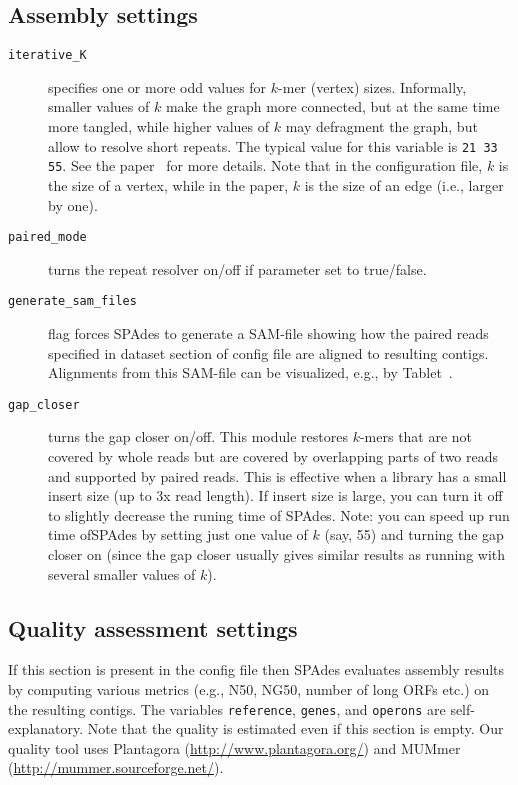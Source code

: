 \documentclass{article}
\def\spades{SPAdes}
\begin{document}
\subsection{Assembly settings}\label{subsec:assembly}
\begin{description}
\item[{\tt iterative\_K}] specifies one or more odd values for $k$-mer (vertex) sizes.  Informally, smaller values of $k$ make the graph more connected,
but at the same time more tangled, while higher values of $k$ may defragment the graph, but allow to resolve short repeats.
The typical value for this variable is {\tt 21 33 55}. See the paper~\cite{main} for more details.
Note that in the configuration file, $k$ is the size of a vertex, while in the paper, $k$ is the size of an edge (i.e., larger by one).

\item[{\tt paired\_mode}] turns the repeat resolver on/off if parameter set to true/false.

\item[{\tt generate\_sam\_files}] flag forces {\spades} to generate a SAM-file
showing how the paired reads specified in dataset section of config file are aligned to resulting contigs.  Alignments from this SAM-file
can be visualized, e.g., by Tablet~\cite{tablet}.

\item[{\tt gap\_closer}] turns the gap closer on/off. This module restores $k$-mers that are not covered by whole reads
but are covered by overlapping parts of two reads and supported by paired reads. This is effective when a library has a small insert size (up to 3x read length). If insert size is large, you can turn it off to slightly decrease the runing time of {\spades}.
Note: you can speed up run time of{\spades} by setting just one value of $k$ (say, 55) and turning the gap closer on
(since the gap closer usually gives similar results as running with several smaller values of $k$).
\end{description}

\subsection{Quality assessment settings}
If this section is present in the config file then
{\spades} evaluates assembly results by computing various metrics (e.g., N50, NG50, number of long ORFs etc.) on the resulting contigs.
The variables {\tt reference}, {\tt genes}, and {\tt operons} are self-explanatory.
Note that the quality is estimated even if this section is empty. Our quality tool uses Plantagora (\url{http://www.plantagora.org/}) and MUMmer (\url{http://mummer.sourceforge.net/}).
\end{document}
